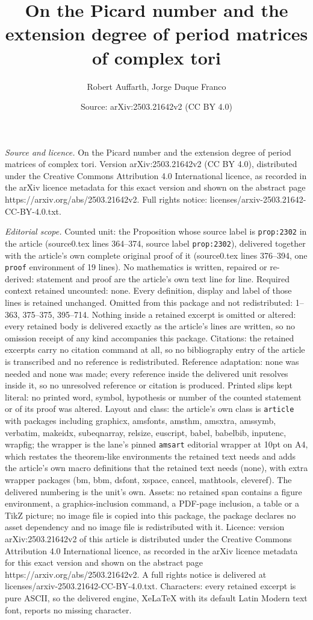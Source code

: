 \documentclass[10pt,a4paper]{amsart}
\title[On the Picard number and the extension degree of period matr]{On the Picard number and the extension degree of period matrices of complex tori}
\author{Robert Auffarth, Jorge Duque Franco}
\date{Source: arXiv:2503.21642v2 (CC BY 4.0)}
\begin{document}
\maketitle

\noindent\emph{Source and licence.} On the Picard number and the extension degree of period matrices of complex tori. Version arXiv:2503.21642v2 (CC BY 4.0), distributed under the Creative Commons Attribution 4.0 International licence, as recorded in the arXiv licence metadata for this exact version and shown on the abstract page https://arxiv.org/abs/2503.21642v2. Full rights notice: licenses/arxiv-2503.21642-CC-BY-4.0.txt.\par\smallskip

\noindent\textit{Editorial scope.} Counted unit: the Proposition whose source label is \texttt{prop:2302} in the article (source0.tex lines 364--374, source label \texttt{prop:2302}), delivered together with the article's own complete original proof of it (source0.tex lines 376--394, one \texttt{proof} environment of 19 lines). No mathematics is written, repaired or re-derived: statement and proof are the article's own text line for line. Required context retained uncounted: none. Every definition, display and label of those lines is retained unchanged. Omitted from this package and not redistributed: 1--363, 375--375, 395--714. Nothing inside a retained excerpt is omitted or altered: every retained body is delivered exactly as the article's lines are written, so no omission receipt of any kind accompanies this package. Citations: the retained excerpts carry no citation command at all, so no bibliography entry of the article is transcribed and no reference is redistributed. Reference adaptation: none was needed and none was made; every reference inside the delivered unit resolves inside it, so no unresolved reference or citation is produced. Printed slips kept literal: no printed word, symbol, hypothesis or number of the counted statement or of its proof was altered. Layout and class: the article's own class is \texttt{article} with packages including graphicx, amsfonts, amsthm, amsxtra, amssymb, verbatim, makeidx, subeqnarray, relsize, euscript, babel, babelbib, inputenc, wrapfig; the wrapper is the lane's pinned \texttt{amsart} editorial wrapper at 10pt on A4, which restates the theorem-like environments the retained text needs and adds the article's own macro definitions that the retained text needs (none), with extra wrapper packages (bm, bbm, dsfont, xspace, cancel, mathtools, cleveref). The delivered numbering is the unit's own. Assets: no retained span contains a figure environment, a graphics-inclusion command, a PDF-page inclusion, a table or a TikZ picture; no image file is copied into this package, the package declares no asset dependency and no image file is redistributed with it. Licence: version arXiv:2503.21642v2 of this article is distributed under the Creative Commons Attribution 4.0 International licence, as recorded in the arXiv licence metadata for this exact version and shown on the abstract page https://arxiv.org/abs/2503.21642v2. A full rights notice is delivered at licenses/arxiv-2503.21642-CC-BY-4.0.txt. Characters: every retained excerpt is pure ASCII, so the delivered engine, XeLaTeX with its default Latin Modern text font, reports no missing character.
\end{document}
